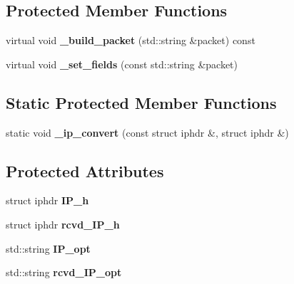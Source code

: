 \subsection*{Protected Member Functions}
\begin{CompactItemize}
\item 
\hypertarget{classsocketpp_1_1IP__RawSocket_a8123cfd347fdf46ad2268205ec81c28}{
virtual void \textbf{\_\-build\_\-packet} (std::string \&packet) const }
\label{classsocketpp_1_1IP__RawSocket_a8123cfd347fdf46ad2268205ec81c28}

\item 
\hypertarget{classsocketpp_1_1IP__RawSocket_c39832f1ad83184cd5ba94c4c967f465}{
virtual void \textbf{\_\-set\_\-fields} (const std::string \&packet)}
\label{classsocketpp_1_1IP__RawSocket_c39832f1ad83184cd5ba94c4c967f465}

\end{CompactItemize}
\subsection*{Static Protected Member Functions}
\begin{CompactItemize}
\item 
\hypertarget{classsocketpp_1_1IP__RawSocket_27451e7fdda82854d42530a269afa06d}{
static void \textbf{\_\-ip\_\-convert} (const struct iphdr \&, struct iphdr \&)}
\label{classsocketpp_1_1IP__RawSocket_27451e7fdda82854d42530a269afa06d}

\end{CompactItemize}
\subsection*{Protected Attributes}
\begin{CompactItemize}
\item 
\hypertarget{classsocketpp_1_1IP__RawSocket_ea5a4e6f2855dd60e3f1fabfa4f9f94f}{
struct iphdr \textbf{IP\_\-h}}
\label{classsocketpp_1_1IP__RawSocket_ea5a4e6f2855dd60e3f1fabfa4f9f94f}

\item 
\hypertarget{classsocketpp_1_1IP__RawSocket_a5f802e17a5d5503cddf5a6020db056f}{
struct iphdr \textbf{rcvd\_\-IP\_\-h}}
\label{classsocketpp_1_1IP__RawSocket_a5f802e17a5d5503cddf5a6020db056f}

\item 
\hypertarget{classsocketpp_1_1IP__RawSocket_05761cfc5307ac731cb05fdc0f500469}{
std::string \textbf{IP\_\-opt}}
\label{classsocketpp_1_1IP__RawSocket_05761cfc5307ac731cb05fdc0f500469}

\item 
\hypertarget{classsocketpp_1_1IP__RawSocket_0457fe2b23f01b7304e2bf1441fc7300}{
std::string \textbf{rcvd\_\-IP\_\-opt}}
\label{classsocketpp_1_1IP__RawSocket_0457fe2b23f01b7304e2bf1441fc7300}

\end{CompactItemize}


